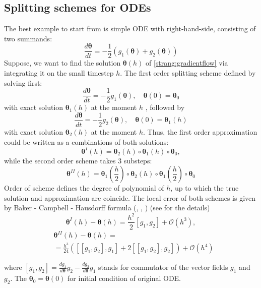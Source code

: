 \documentclass{article}
\newcommand{\vect}[1]{\boldsymbol{\mathbf{#1}}}
\begin{document}
\subsection{Splitting schemes for ODEs}
The best example to start from is simple ODE with right-hand-side, consisting of two summands:
\begin{equation}
    \frac{d \vect{\theta}}{d t} = - \frac{1}{2} \left( g_1(\vect{\theta}) + g_2(\vect{\theta})\right)
    \label{strang:gradientflow}
\end{equation}
Suppose, we want to find the solution $\vect{\theta}(h)$ of \eqref{strang:gradientflow} via integrating it on the small timestep $h$. The first order splitting scheme defined by solving first:
$$
\frac{d \vect{\theta}}{d t} = - \frac{1}{2} g_1(\vect{\theta}), \quad \vect{\theta}(0) = \vect{\theta}_0
$$
with exact solution $\vect{\theta}_1(h)$ at the moment $h$ , followed by
$$
\frac{d \vect{\theta}}{d t} = - \frac{1}{2} g_2(\vect{\theta}), \quad \vect{\theta}(0) = \vect{\theta}_1(h)
$$
with exact solution $\vect{\theta}_2(h)$ at the moment $h$. Thus, the first order approximation could be written as a combinations of both solutions:
$$
\vect{\theta}^I(h) = \vect{\theta}_2(h) \circ \vect{\theta}_1(h) \circ \vect{\theta}_0,
$$
while the second order scheme takes 3 substeps:
$$
\vect{\theta}^{II}(h) = \vect{\theta}_1\left(\frac{h}{2}\right) \circ \vect{\theta}_2(h) \circ \vect{\theta}_1\left(\frac{h}{2}\right) \circ \vect{\theta}_0
$$
Order of scheme defines the degree of polynomial of $h$, up to which the true solution and approximation are coincide. The local error of both schemes is given by Baker - Campbell - Hausdorff formula (\cite{baker1901further}, \cite{campbell1896law}, \cite{hausdorff1906symbolische}) (see \cite{macnamara2016operator} for the details)
\begin{equation}
    \label{strang:lie_error}
    \vect{\theta}^I(h) - \vect{\theta}(h) = \frac{h^2}{2} \left[g_{1}, g_{2}\right]  + \mathcal{O}(h^3),
\end{equation}
\begin{equation}
    \label{strang:marchuk_error}
    \begin{split}
    &\vect{\theta}^{II}(h) - \vect{\theta}(h) =\\&= \frac{h^{3}}{24} \left([[g_1, g_2], g_1]+2[[g_1, g_2], g_2]\right)+\mathcal{O}\left(h^{4}\right)
    \end{split}
\end{equation}

where $\left[ g_1, g_2\right] = \frac{d g_1}{d \vect{\theta}} g_2 - \frac{d g_2}{d \vect{\theta}} g_1 $ stands for commutator of the vector fields $g_1$ and $g_2$. The $\vect{\theta}_0 = \vect{\theta}(0)$ for initial condition of original ODE.
\end{document}
